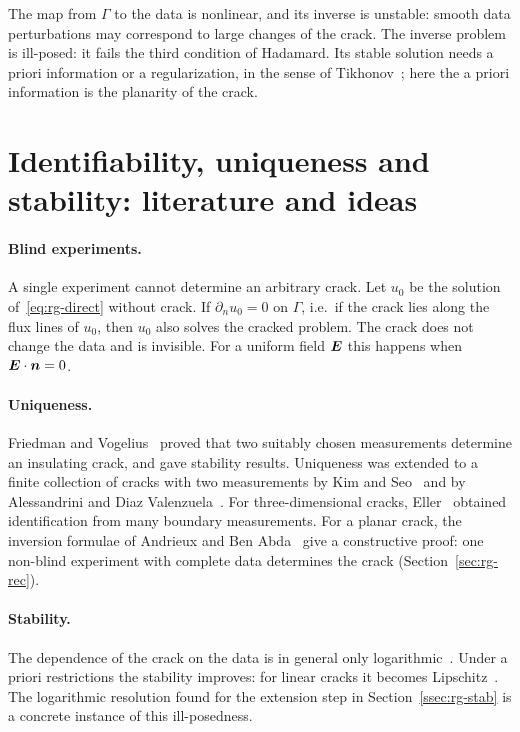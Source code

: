 The map from $\Gamma$ to the data is nonlinear, and its inverse is unstable: smooth data perturbations may correspond to large changes of the crack. The inverse problem is ill-posed: it fails the third condition of Hadamard. Its stable solution needs a priori information or a regularization, in the sense of Tikhonov~\cite{TA77}; here the a priori information is the planarity of the crack.

\section{Identifiability, uniqueness and stability: literature and ideas}\label{sec:rg-lit}
\paragraph{Blind experiments.} A single experiment cannot determine an arbitrary crack. Let $u_0$ be the solution of~\eqref{eq:rg-direct} without crack. If $\partial_n u_0=0$ on $\Gamma$, i.e.\ if the crack lies along the flux lines of $u_0$, then $u_0$ also solves the cracked problem. The crack does not change the data and is invisible. For a uniform field $\bm{E}$ this happens when $\bm{E}\cdot\bm{n}=0$.
%

\paragraph{Uniqueness.} Friedman and Vogelius~\cite{FV89} proved that two suitably chosen measurements determine an insulating crack, and gave stability results. Uniqueness was extended to a finite collection of cracks with two measurements by Kim and Seo~\cite{KS96} and by Alessandrini and Diaz Valenzuela~\cite{ADV96}. For three-dimensional cracks, Eller~\cite{Ell96} obtained identification from many boundary measurements. For a planar crack, the inversion formulae of Andrieux and Ben Abda~\cite{AB96} give a constructive proof: one non-blind experiment with complete data determines the crack (Section~\ref{sec:rg-rec}).
%

\paragraph{Stability.} The dependence of the crack on the data is in general only logarithmic~\cite{Ale93}. Under a priori restrictions the stability improves: for linear cracks it becomes Lipschitz~\cite{ABV96}. The logarithmic resolution found for the extension step in Section~\ref{ssec:rg-stab} is a concrete instance of this ill-posedness.
%

